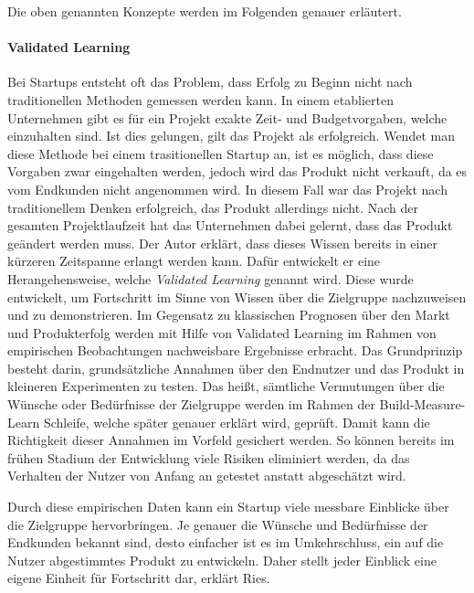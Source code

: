 Die oben genannten Konzepte werden im Folgenden genauer erläutert.

\paragraph{Validated Learning}
Bei Startups entsteht oft das Problem, dass Erfolg zu Beginn nicht nach traditionellen Methoden gemessen werden kann. In einem etablierten Unternehmen gibt es für ein Projekt exakte Zeit- und Budgetvorgaben, welche einzuhalten sind. Ist dies gelungen, gilt das Projekt als erfolgreich. Wendet man diese Methode bei einem trasitionellen Startup an, ist es möglich, dass diese Vorgaben zwar eingehalten werden, jedoch wird das Produkt nicht verkauft, da es vom Endkunden nicht angenommen wird. In diesem Fall war das Projekt nach traditionellem Denken erfolgreich, das Produkt allerdings nicht. Nach der gesamten Projektlaufzeit hat das Unternehmen dabei gelernt, dass das Produkt geändert werden muss. Der Autor erklärt, dass dieses Wissen bereits in einer kürzeren Zeitspanne erlangt werden kann. Dafür entwickelt er eine Herangehensweise, welche \textit{Validated Learning} genannt wird. Diese wurde entwickelt, um Fortschritt im Sinne von Wissen über die Zielgruppe nachzuweisen und zu demonstrieren. Im Gegensatz zu klassischen Prognosen über den Markt und Produkterfolg werden mit Hilfe von Validated Learning im Rahmen von empirischen Beobachtungen nachweisbare Ergebnisse erbracht. Das Grundprinzip besteht darin, grundsätzliche Annahmen über den Endnutzer und das Produkt in kleineren Experimenten zu testen. Das heißt, sämtliche Vermutungen über die Wünsche oder Bedürfnisse der Zielgruppe werden im Rahmen der Build-Measure-Learn Schleife, welche später genauer erklärt wird, geprüft. Damit kann die Richtigkeit dieser Annahmen im Vorfeld gesichert werden. So können bereits im frühen Stadium der Entwicklung viele Risiken eliminiert werden, da das Verhalten der Nutzer von Anfang an getestet anstatt abgeschätzt wird.

Durch diese empirischen Daten kann ein Startup viele messbare Einblicke über die Zielgruppe hervorbringen. Je genauer die Wünsche und Bedürfnisse der Endkunden bekannt sind, desto einfacher ist es im Umkehrschluss, ein auf die Nutzer abgestimmtes Produkt zu entwickeln. Daher stellt jeder Einblick eine eigene Einheit für Fortschritt dar, erklärt Ries.

